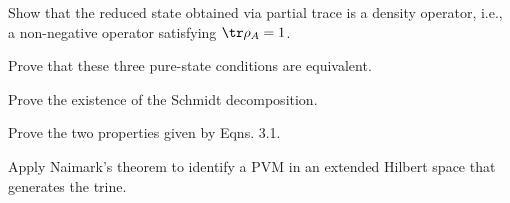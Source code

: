 \documentclass[
	pages,
	boxes,
	color=RoyalPurple
]{homework}
\makeatletter
\numberwithin{tcb@cnt@prob}{section}
\makeatother
\begin{document}
\begin{acronym}
\end{acronym}

\setcounter{section}{2}

\begin{problem}
Show that the reduced state obtained via partial trace is a density operator, i.e., a non-negative operator satisfying $\tr\rho_A = 1$.
\end{problem}

\begin{solution}
\end{solution}

\begin{problem}
Prove that these three pure-state conditions are equivalent.
\end{problem}

\begin{solution}
\end{solution}


\begin{problem}
Prove the existence of the Schmidt decomposition.
\end{problem}

\begin{solution}
\end{solution}

\setcounter{section}{3}

\begin{problem}
Prove the two properties given by Eqns. 3.1.
\end{problem}

\begin{solution}
\end{solution}

\begin{problem}
Apply Naimark's theorem to identify a \ac{PVM} in an extended Hilbert space that generates the trine.
\end{problem}

\begin{solution}
\end{solution}
\end{document}
